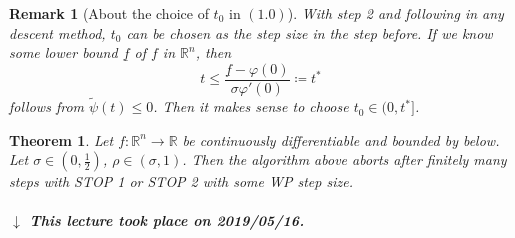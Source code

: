 \documentclass[a4paper]{article}
\newcounter{lecref}[subsection]
\numberwithin{lecref}{subsection}
\newtheorem{theorem}[lecref]{Theorem}
\newtheorem*{Remark}{Remark}
\newcommand{\dateref}[1]{%
  \begin{mdframed}[backgroundcolor=gray!10,innerbottommargin=0pt,innertopmargin=0pt]
    \paragraph{\textit{$\downarrow$ This lecture took place on #1.}}%
  \end{mdframed}%
}
\begin{document}
\begin{Remark}[About the choice of $t_0$ in $(1.0)$]
	With step 2 and following in any descent method, $t_0$ can be chosen as the step size in the step before.
	If we know some lower bound $\underline f$ of $f$ in $\mathbb R^n$, then
	\[ t \leq \frac{\underline f - \varphi(0)}{\sigma \varphi'(0)} \coloneqq t^* \]
	follows from $\tilde \psi(t) \leq 0$. Then it makes sense to choose $t_0 \in (0, t^*]$.
\end{Remark}

\begin{theorem}
	\label{theorem:5.4.5}
	Let $f: \mathbb R^n \to \mathbb R$ be continuously differentiable and bounded by below.
	Let $\sigma \in (0, \frac12)$, $\rho \in (\sigma, 1)$. Then the algorithm above aborts after finitely many steps with STOP 1 or STOP 2 with some WP step size.
\end{theorem}

\dateref{2019/05/16}
\end{document}
